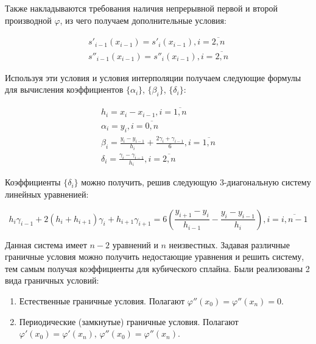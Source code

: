 Также накладываются требования наличия непрерывной первой и второй производной $\varphi$, из чего получаем дополнительные условия:


\begin{equation}
  \begin{gathered}
    s'_{i-1}(x_{i-1}) = s'_i(x_{i-1}), i = \overline{2, n} \\
    s''_{i-1}(x_{i-1}) = s''_i(x_{i-1}), i = \overline{2, n}
  \end{gathered}
\end{equation}

Используя эти условия и условия интерполяции получаем следующие формулы для вычисления коэффициентов $\{\alpha_i\}$, $\{\beta_i\}$, $\{\delta_i\}$:

\begin{equation}
  \begin{gathered}
    h_i = x_i - x_{i-1}, i = \overline{1, n} \\
    \alpha_i = y_i, i = \overline{0, n} \\
    \beta_i = \frac{y_i - y_{i-1}}{h_i} + \frac{2\gamma_i + \gamma_{i - 1}}{6}, i = \overline{1, n} \\
    \delta_i = \frac{\gamma_i - \gamma_{i-1}}{h_i}, i = \overline{2, n}
  \end{gathered}
\end{equation}

Коэффициенты $\{\delta_i\}$ можно получить, решив следующую 3-диагональную систему линейных уравненией:

\begin{equation}
  h_i \gamma_{i-1} + 2(h_i + h_{i+1})\gamma_i + h_{i+1}\gamma_{i+1} =
  6 (\frac{y_{i+1} - y_i}{h_{i-1}} - \frac{y_i - y_{i-1}}{h_i}), i = \overline{i, n - 1}
\end{equation}

Данная система имеет $n-2$ уравнений и $n$ неизвестных. Задавая различные граничные условия можно получить недостающие уравнения и решить систему, тем самым получая коэффициенты для кубического сплайна. Были реализованы 2 вида граничных условий:

\begin{enumerate}
\item Естественные граничные условия. Полагают $\varphi''(x_0)= \varphi''(x_n)=0$.
\item Периодические (замкнутые) граничные условия. Полагают $\varphi'(x_0)=\varphi'(x_n),\, \varphi''(x_0)=\varphi''(x_n)$.
\end{enumerate}

